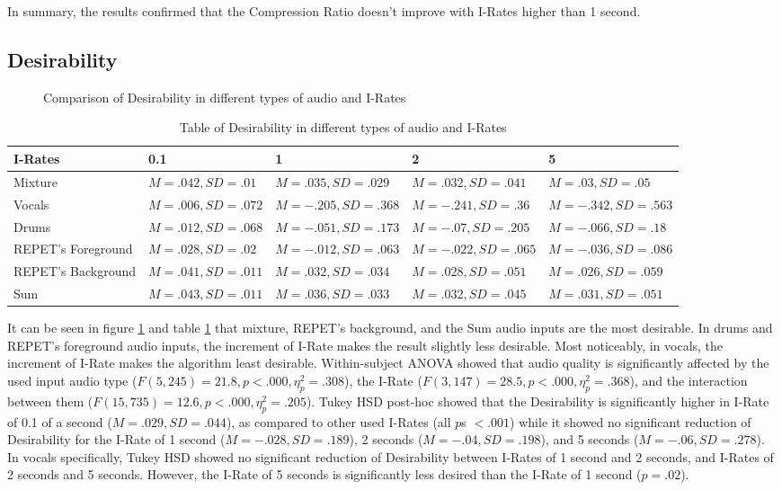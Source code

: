 In summary, the results confirmed that the Compression Ratio doesn't improve with I-Rates higher than 1 second.

\subsection{Desirability}

\begin{figure}[ht]
  
  \caption{Comparison of Desirability in different types of audio and I-Rates}
  \label{fig:irate-desirable}
\end{figure}

\begin{table}[ht]
\centering
\begin{tabularx}{\linewidth}{|X|X|X|X|X|}
\hline
I-Rates & 0.1 & 1 & 2 & 5 \\
\hline
Mixture & $M=.042, SD=.01$ & $M=.035, SD=.029$ & $M=.032, SD=.041$ & $M=.03, SD=.05$\\
\hline
Vocals & $M=.006, SD=.072$ & $M=-.205, SD=.368$ & $M=-.241, SD=.36$ & $M=-.342, SD=.563$ \\
\hline
Drums & $M=.012, SD=.068$ & $M=-.051, SD=.173$ & $M=-.07, SD=.205$ & $M=-.066, SD=.18$ \\
\hline
REPET's Foreground & $M=.028, SD=.02$ & $M=-.012, SD=.063$ & $M=-.022, SD=.065$ & $M=-.036, SD=.086$  \\
\hline
REPET's Background & $M=.041, SD=.011$ & $M=.032, SD=.034$ & $M=.028, SD=.051$ & $M=.026, SD=.059$ \\
\hline
Sum & $M=.043, SD=.011$ & $M=.036, SD=.033$ & $M=.032, SD=.045$ & $M=.031, SD=.051$ \\
\hline
\end{tabularx}
\caption{Table of Desirability in different types of audio and I-Rates}
\label{tab:irate-desirable}
\end{table}

It can be seen in figure \ref{fig:irate-desirable} and table \ref{tab:irate-desirable} that mixture, REPET's background, and the Sum audio inputs are the most desirable.
In drums and REPET's foreground audio inputs, the increment of I-Rate makes the result slightly less desirable.
Most noticeably, in vocals, the increment of I-Rate makes the algorithm least desirable.
Within-subject ANOVA showed that audio quality is significantly affected by the used input audio type ($F(5,245)=21.8, p<.000, \eta_{p}^{2}=.308$), the I-Rate ($F(3,147)=28.5, p<.000, \eta_{p}^{2}=.368$), and the interaction between them ($F(15,735)=12.6, p<.000, \eta_{p}^{2}=.205$).
Tukey HSD post-hoc showed that the Desirability is significantly higher in I-Rate of 0.1 of a second ($M=.029, SD=.044$), as compared to other used I-Rates (all $p$s $<.001$) while it showed no significant reduction of Desirability for the I-Rate of 1 second ($M=-.028, SD=.189$), 2 seconds ($M=-.04, SD=.198$), and 5 seconds ($M=-.06, SD=.278$). In vocals specifically, Tukey HSD showed no significant reduction of Desirability between I-Rates of 1 second and 2 seconds, and I-Rates of 2 seconds and 5 seconds. However, the I-Rate of 5 seconds is significantly less desired than the I-Rate of 1 second ($p=.02$).


